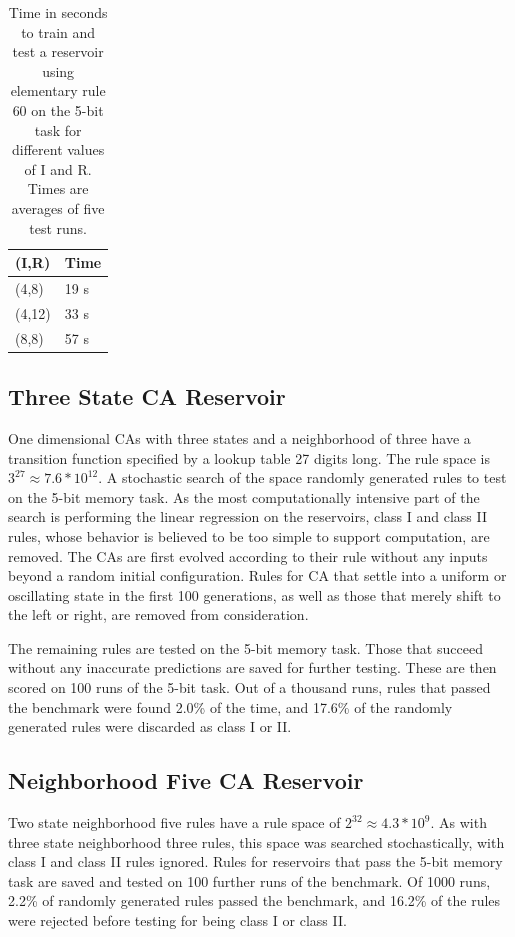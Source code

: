 \documentclass{facconf}
\begin{document}
\begin{multicols}{2}
\begin{table}[H]
\begin{tabular}{|l|l|}
\hline
(I,R) & Time \\ \hline
(4,8) & 19 s \\ \hline
(4,12) & 33 s \\ \hline
(8,8) & 57 s \\ \hline
\end{tabular}
\caption{Time in seconds to train and test a reservoir using elementary rule 60 
    on the 5-bit task for different values of I and R. Times are averages of 
        five test runs.}
\label{table:time}
\end{table}

  
\subsection{Three State CA Reservoir}
One dimensional CAs with three states and a neighborhood of three have a 
transition function specified by a lookup table 27 digits long. The rule space 
is $3^27 \approx 7.6 * 10^12$. A stochastic search of the space randomly 
generated rules to test on the 5-bit memory task. As the most computationally 
intensive part of the search is performing the linear regression on the 
reservoirs, class I and class II rules, whose behavior is believed to be too 
simple to support computation, are removed. The CAs are first evolved according 
to their rule without any inputs beyond a random initial configuration. Rules 
for CA that settle into a uniform or oscillating state in the first 100 
generations, as well as those that merely shift to the left or right, are 
removed from consideration.\par
The remaining rules are tested on the 5-bit memory task.  Those that succeed 
without any inaccurate predictions are saved for further testing.  These are 
then scored on 100 runs of the 5-bit task.  Out of a thousand runs, rules that 
passed the benchmark were found 2.0\% of the time, and 17.6\% of the randomly 
generated rules were discarded as class I or II.
    
\subsection{Neighborhood Five CA Reservoir}
Two state neighborhood five rules have a rule space of $2^32 \approx 4.3 * 
10^9$. As with three state neighborhood three rules, this space was searched 
stochastically, with class I and class II rules ignored. Rules for reservoirs 
that pass the 5-bit memory task are saved and tested on 100 further runs of the 
benchmark. Of 1000 runs, 2.2\% of randomly generated rules passed the 
benchmark, and 16.2\% of the rules were rejected before testing for being class 
I or class II.

\end{multicols}
\end{document}
